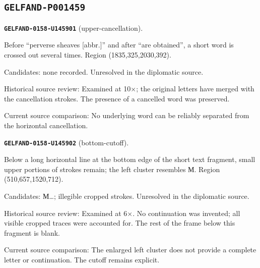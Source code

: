 \subsection*{\texttt{GELFAND-P001459}}
\par\noindent\leavevmode{}\label{GELFAND-0158-U145901}\label{GELFAND-P001459:upper-cancellation}\textbf{\texttt{GELFAND-0158-U145901}} (upper-cancellation).\nopagebreak[4]\par
Before “perverse sheaves [abbr.]” and after “are obtained”, a short word is crossed out several times. Region (1835,325,2030,392).\par
Candidates: none recorded. Unresolved in the diplomatic source.\par
Historical source review: Examined at 10×; the original letters have merged with the cancellation strokes. The presence of a cancelled word was preserved.\par
Current source comparison: No underlying word can be reliably separated from the horizontal cancellation.\par\medskip
\par\noindent\leavevmode{}\label{GELFAND-0158-U145902}\label{GELFAND-P001459:bottom-cutoff}\textbf{\texttt{GELFAND-0158-U145902}} (bottom-cutoff).\nopagebreak[4]\par
Below a long horizontal line at the bottom edge of the short text fragment, small upper portions of strokes remain; the left cluster resembles М. Region (510,657,1520,712).\par
Candidates: М…; illegible cropped strokes. Unresolved in the diplomatic source.\par
Historical source review: Examined at 6×. No continuation was invented; all visible cropped traces were accounted for. The rest of the frame below this fragment is blank.\par
Current source comparison: The enlarged left cluster does not provide a complete letter or continuation. The cutoff remains explicit.\par\medskip
